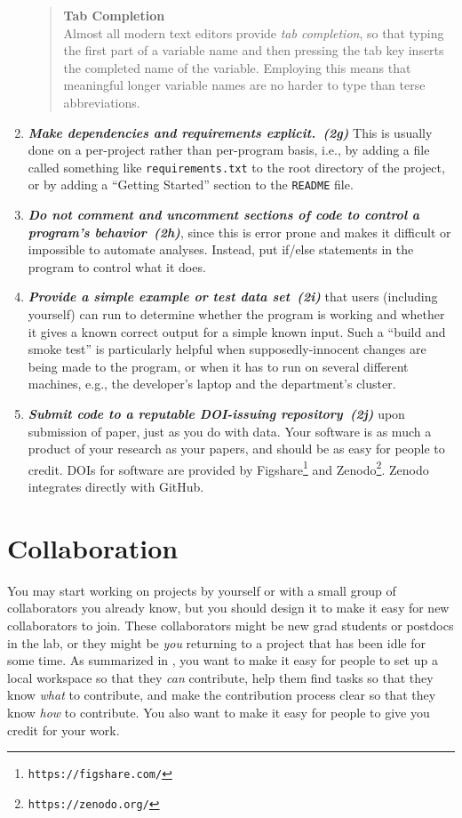 \documentclass[10pt,letterpaper]{article}
\newcommand{\withurl}[2]{{#1}\footnote{{\texttt{#2}}}}
\newcommand{\practicesection}[2]{\section{#1}\label{#2}}
\newcommand{\practice}[2]{\textbf{\emph{{#2}~({#1})}}}
\begin{document}
\begin{enumerate}
  \begin{quote}
    \noindent \textbf{Tab Completion}
    \\
    Almost all modern text editors provide \emph{tab completion}, so
    that typing the first part of a variable name and then pressing
    the tab key inserts the completed name of the variable.  Employing
    this means that meaningful longer variable names are no harder to type
    than terse abbreviations.

  \end{quote}

\item
  \practice{2g}{Make dependencies and requirements explicit.} This is
  usually done on a per-project rather than per-program basis, i.e.,
  by adding a file called something like \texttt{requirements.txt} to
  the root directory of the project, or by adding a ``Getting
  Started'' section to the \texttt{README} file.

\item
  \practice{2h}{Do not comment and uncomment sections of code to control
    a program's behavior}, since this is error prone and makes it
  difficult or impossible to automate analyses. Instead, put if/else
  statements in the program to control what it does.

\item
  \practice{2i}{Provide a simple example or test data set} that users
  (including yourself) can run to determine whether the program is
  working and whether it gives a known correct output for a
  simple known input. Such a ``build and smoke test'' is particularly
  helpful when supposedly-innocent changes are being made to the
  program, or when it has to run on several different machines, e.g.,
  the developer's laptop and the department's cluster.

\item
  \practice{2j}{Submit code to a reputable DOI-issuing repository} upon
  submission of paper, just as you do with data. Your software is as
  much a product of your research as your papers, and should be as
  easy for people to credit. DOIs for software are provided by
  \withurl{Figshare}{https://figshare.com/} and
  \withurl{Zenodo}{https://zenodo.org/}. Zenodo integrates directly
  with GitHub.

\end{enumerate}

\practicesection{Collaboration}{sec:collaboration}

You may start working on projects by yourself or with a small group of
collaborators you already know, but you should design it to make it easy
for new collaborators to join. These collaborators might be new
grad students or postdocs in the lab, or they might be \emph{you}
returning to a project that has been idle for some time. As summarized
in \cite{steinmacher2015}, you want to make it easy for people to set up a
local workspace so that they \emph{can} contribute, help them find tasks
so that they know \emph{what} to contribute, and make the contribution
process clear so that they know \emph{how} to contribute.  You also want
to make it easy for people to give you credit for your work.
\end{document}
